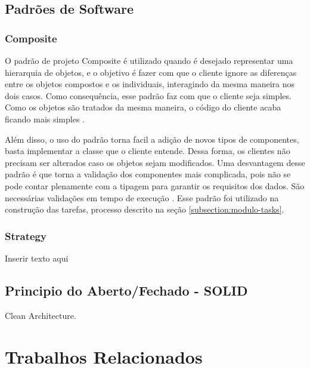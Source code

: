 \documentclass[12pt]{tcc}
\begin{document}
	\section{Padrões de Software}
	\label{cap:padroes-de-software}


	\subsection{Composite}
	\label{subsection:composite}

	O padrão de projeto Composite é utilizado quando é desejado representar uma hierarquia de objetos, e o objetivo é fazer com que o cliente ignore as diferenças entre os objetos compostos e os individuais, interagindo da mesma maneira nos dois casos. Como consequência, esse padrão faz com que o cliente seja simples. Como os objetos são tratados da mesma maneira, o código do cliente acaba ficando mais simples \citep[Capítulo 4]{gamma1994design}.
	
	Além disso, o uso do padrão torna facil a adição de novos tipos de componentes, basta implementar a classe que o cliente entende. Dessa forma, os clientes não precisam ser alterados caso os objetos sejam modificados. Uma desvantagem desse padrão é que torna a validação dos componentes mais complicada, pois não se pode contar plenamente com a tipagem para garantir os requisitos dos dados. São necessárias validações em tempo de execução \citep[Capítulo 4]{gamma1994design}. Esse padrão foi utilizado na construção das tarefas, processo descrito na seção \ref{subsection:modulo-tasks}.



	\subsection{Strategy}
	\label{subsection:strategy}
	Inserir texto aqui \citep{gamma1994design}


	\section{Principio do Aberto/Fechado - SOLID}
	\label{cap:solid}
	Clean Architecture.



\chapter{Trabalhos Relacionados}
\label{cap:metodologiatrabsrelacionados}
\end{document}
